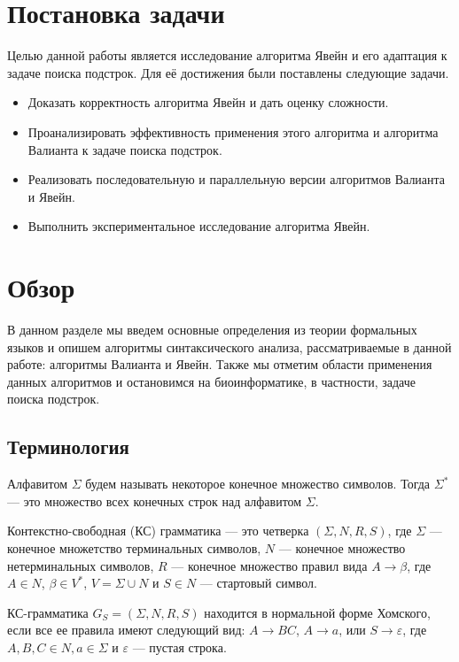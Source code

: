 \documentclass[14pt]{matmex-diploma-custom}
\begin{document}
\section{Постановка задачи}

Целью данной работы является исследование алгоритма Явейн и его адаптация к задаче поиска подстрок.
Для её достижения были поставлены следующие задачи.

\begin{itemize}
	\item Доказать корректность алгоритма Явейн и дать оценку сложности.
	\item Проанализировать эффективность применения этого алгоритма и алгоритма Валианта к задаче поиска подстрок.
	\item Реализовать последовательную и параллельную версии алгоритмов Валианта и Явейн.
	\item Выполнить экспериментальное исследование алгоритма Явейн.
\end{itemize}
	

\section{Обзор}

В данном разделе мы введем основные определения из теории формальных языков и опишем алгоритмы синтаксического анализа, рассматриваемые в данной работе: алгоритмы Валианта и Явейн. Также мы отметим области применения данных алгоритмов и остановимся на биоинформатике, в частности, задаче поиска подстрок.

\subsection{Терминология}

Алфавитом $\Sigma$ будем называть некоторое конечное множество символов.
Тогда $\Sigma^{*}$ --- это множество всех конечных строк над алфавитом $\Sigma$.

Контекстно-свободная (КС) грамматика --- это четверка $(\Sigma, N, R, S)$, где $\Sigma$ --- конечное множетство терминальных символов, $N$ --- конечное множество нетерминальных символов, $R$ --- конечное множество правил вида $A \rightarrow \beta$, где $A \in N$, $\beta \in V^{*}$, $V = \Sigma \cup N$ и $S \in N$ --- стартовый символ.

КС-грамматика $G_S = (\Sigma, N, R, S)$ находится в нормальной форме Хомского, если все ее правила имеют следующий вид: $A \rightarrow BC$, $A \rightarrow a$, или $S \rightarrow \varepsilon$, 
где $A, B, C \in N, a \in \Sigma$ и $\varepsilon$ --- пустая строка.
\end{document}

